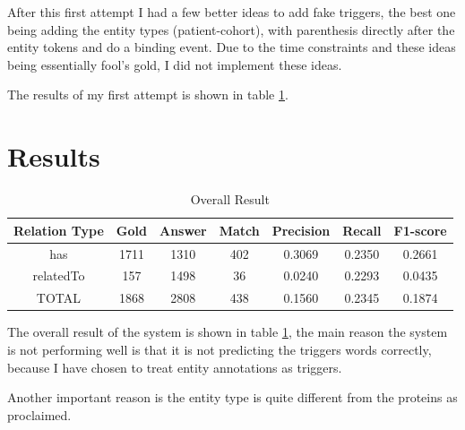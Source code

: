 After this first attempt I had a few better ideas to add fake triggers, the best one being adding the entity types (patient-cohort), with parenthesis directly after the entity tokens and do a binding event. Due to the time constraints and these ideas being essentially fool's gold, I did not implement these ideas. 

The results of my first attempt is shown in table \ref{table:overall_result}.


\section{Results}
\begin{table}
	\caption{Overall Result}
	\centering
	\label{table:overall_result}
	\begin{tabular}{|c | c c |c c c c |}
		\hline 
		{Relation Type} 
		& Gold & Answer  & Match  & Precision & Recall & F1-score\\ 
		\hline
		has  & 1711 & 1310 & 402 & 0.3069 & 0.2350 & 0.2661 \\
		
		relatedTo & 157 & 1498 &  36 & 0.0240 & 0.2293 & 0.0435\\
		\hline 
		TOTAL  & 1868 & 2808 & 438 & 0.1560 & 0.2345 & 0.1874 \\
		\hline 
	\end{tabular}
\end{table}
The overall result of the system is shown in table \ref{table:overall_result}, the main reason the system is not performing well is that it is not predicting the triggers words correctly, because I have chosen to treat entity annotations as triggers.

Another important reason is the entity type is quite different from the proteins as proclaimed. 